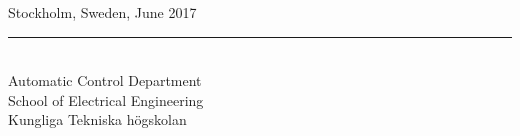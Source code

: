 \begin{titlepage}
\begin{center}
  \large Stockholm, Sweden, June 2017 \\
  \rule{250pt}{2pt} \\
  \large Automatic Control Department \\
  \large School of Electrical Engineering \\
  \large Kungliga Tekniska högskolan






\end{center}
\end{titlepage}
